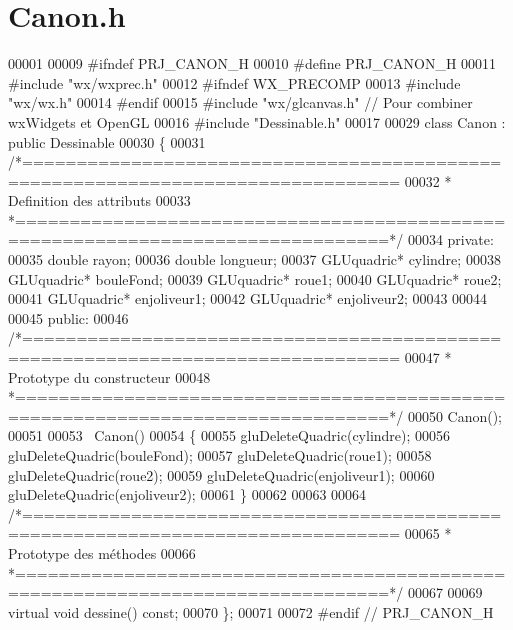 \section{Canon.\+h}
\label{_canon_8h_source}

\begin{DoxyCode}
00001 
00009 \textcolor{preprocessor}{#ifndef PRJ\_CANON\_H}
00010 \textcolor{preprocessor}{#define PRJ\_CANON\_H}
00011 \textcolor{preprocessor}{#include "wx/wxprec.h"}
00012 \textcolor{preprocessor}{#ifndef WX\_PRECOMP}
00013 \textcolor{preprocessor}{#include "wx/wx.h"}
00014 \textcolor{preprocessor}{#endif}
00015 \textcolor{preprocessor}{#include "wx/glcanvas.h"} \textcolor{comment}{// Pour combiner wxWidgets et OpenGL}
00016 \textcolor{preprocessor}{#include "Dessinable.h"}
00017 
00029 \textcolor{keyword}{class }Canon : \textcolor{keyword}{public} Dessinable
00030 \{
00031 \textcolor{comment}{/*================================================================================}
00032 \textcolor{comment}{ * Definition des attributs}
00033 \textcolor{comment}{ *================================================================================*/}
00034     \textcolor{keyword}{private}:
00035     \textcolor{keywordtype}{double} rayon;
00036     \textcolor{keywordtype}{double} longueur;
00037     GLUquadric* cylindre;
00038     GLUquadric* bouleFond;
00039     GLUquadric* roue1;
00040     GLUquadric* roue2;
00041     GLUquadric* enjoliveur1;
00042     GLUquadric* enjoliveur2;
00043     
00044     
00045     \textcolor{keyword}{public}:
00046 \textcolor{comment}{/*================================================================================}
00047 \textcolor{comment}{ * Prototype du constructeur}
00048 \textcolor{comment}{ *================================================================================*/}
00050     Canon();
00051     
00053     ~Canon() 
00054     \{
00055         gluDeleteQuadric(cylindre);
00056         gluDeleteQuadric(bouleFond);
00057         gluDeleteQuadric(roue1);
00058         gluDeleteQuadric(roue2);
00059         gluDeleteQuadric(enjoliveur1);
00060         gluDeleteQuadric(enjoliveur2);
00061     \}
00062     
00063     
00064 \textcolor{comment}{/*================================================================================}
00065 \textcolor{comment}{ * Prototype des méthodes}
00066 \textcolor{comment}{ *================================================================================*/}
00067 
00069     \textcolor{keyword}{virtual} \textcolor{keywordtype}{void} dessine() \textcolor{keyword}{const};
00070 \};
00071 
00072 \textcolor{preprocessor}{#endif // PRJ\_CANON\_H}
\end{DoxyCode}
